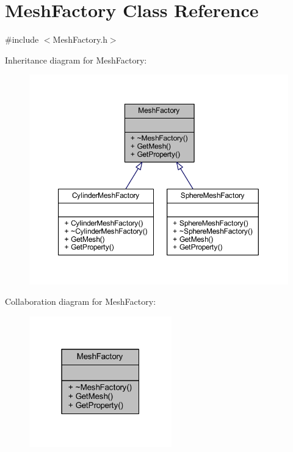 \hypertarget{class_mesh_factory}{}\section{Mesh\+Factory Class Reference}
\label{class_mesh_factory}


{\ttfamily \#include $<$Mesh\+Factory.\+h$>$}



Inheritance diagram for Mesh\+Factory\+:
\nopagebreak
\begin{figure}[H]
\begin{center}
\leavevmode
\includegraphics[width=350pt]{class_mesh_factory__inherit__graph}
\end{center}
\end{figure}


Collaboration diagram for Mesh\+Factory\+:
\nopagebreak
\begin{figure}[H]
\begin{center}
\leavevmode
\includegraphics[width=175pt]{class_mesh_factory__coll__graph}
\end{center}
\end{figure}
